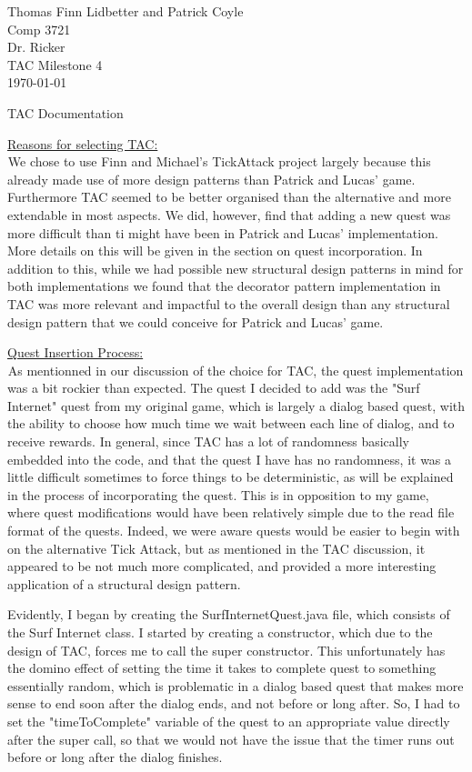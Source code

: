 \documentclass[letter paper, 12pt]{article}
\newcommand{\tab}{${}_{}$\hspace{0.2in}}
\newcommand{\noin}{\noindent}
\begin{document}
\noindent Thomas Finn Lidbetter and Patrick Coyle\\
Comp 3721\\
Dr. Ricker\\
TAC Milestone 4\\
\today \bigskip
\begin{center}
	TAC Documentation
\end{center}
\noin \underline{Reasons for selecting TAC:}\\\newline
\tab We chose to use Finn and Michael's TickAttack project largely because this already made use of more design patterns than Patrick and Lucas' game. Furthermore TAC seemed to be better organised than the alternative and more extendable in most aspects. We did, however, find that adding a new quest was more difficult than ti might have been in Patrick and Lucas' implementation. More details on this will be given in the section on quest incorporation. In addition to this, while we had possible new structural design patterns in mind for both implementations we found that the decorator pattern implementation in TAC was more relevant and impactful to the overall design than any structural design pattern that we could conceive for Patrick and Lucas' game.\bigskip

\noin \underline{Quest Insertion Process:}\\\newline
\tab As mentionned in our discussion of the choice for TAC, the quest implementation was a bit rockier than expected. The quest I decided to add was the "Surf Internet" quest from my original game, which is largely a dialog based quest, with the ability to choose how much time we wait between each line of dialog, and to receive rewards. In general, since TAC has a lot of randomness basically embedded into the code, and that the quest I have has no randomness, it was a little difficult sometimes to force things to be deterministic, as will be explained in the process of incorporating the quest. This is in opposition to my game, where quest modifications would have been relatively simple due to the read file format of the quests. Indeed, we were aware quests would be easier to begin with on the alternative Tick Attack, but as mentioned in the TAC discussion, it appeared to be not much more complicated, and provided a more interesting application of a structural design pattern.\newline

Evidently, I began by creating the SurfInternetQuest.java file, which consists of the Surf Internet class. I started by creating a constructor, which due to the design of TAC, forces me to call the super constructor. This unfortunately has the domino effect of setting the time it takes to complete quest to something essentially random, which is problematic in a dialog based quest that makes more sense to end soon after the dialog ends, and not before or long after. So, I had to set the "timeToComplete" variable of the quest to an appropriate value directly after the super call, so that we would not have the issue that the timer runs out before or long after the dialog finishes.\newline
\end{document}
